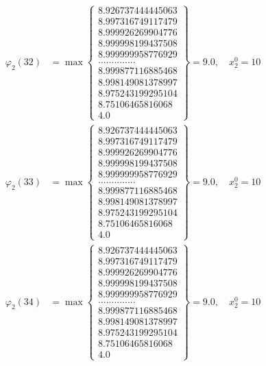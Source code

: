 \documentclass{article}
\begin{document}
\begin{align*}
  
  
  
\varphi_{2}(32) &= \max \left\{ \begin{array}{c}
8.926737444445063 \\
 8.997316749117479 \\
 8.999926269904776 \\
 8.999998199437508 \\
 8.999999958776929 \\
 .............. \\
 8.999877116885468 \\
 8.998149081378997 \\
 8.975243199295104 \\
 8.75106465816068 \\
 4.0
\end{array} \right\} = 9.0, \quad x_{2}^0 = 10\\
  
  
  
  
\varphi_{2}(33) &= \max \left\{ \begin{array}{c}
8.926737444445063 \\
 8.997316749117479 \\
 8.999926269904776 \\
 8.999998199437508 \\
 8.999999958776929 \\
 .............. \\
 8.999877116885468 \\
 8.998149081378997 \\
 8.975243199295104 \\
 8.75106465816068 \\
 4.0
\end{array} \right\} = 9.0, \quad x_{2}^0 = 10\\
  
  
  
  
\varphi_{2}(34) &= \max \left\{ \begin{array}{c}
8.926737444445063 \\
 8.997316749117479 \\
 8.999926269904776 \\
 8.999998199437508 \\
 8.999999958776929 \\
 .............. \\
 8.999877116885468 \\
 8.998149081378997 \\
 8.975243199295104 \\
 8.75106465816068 \\
 4.0
\end{array} \right\} = 9.0, \quad x_{2}^0 = 10\\
  

\end{align*}
\end{document}
